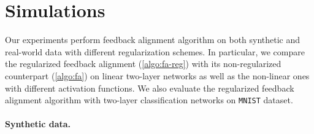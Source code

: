 \section{Simulations}

Our experiments perform feedback alignment algorithm on both synthetic and real-world data with different regularization schemes. In particular, we compare the regularized feedback alignment (\cref{algo:fa-reg}) with its non-regularized counterpart (\cref{algo:fa}) on linear two-layer networks as well as the non-linear ones with different activation functions. We also evaluate the regularized feedback alignment algorithm with two-layer classification networks on \texttt{MNIST} dataset.

\paragraph{Synthetic data.}

